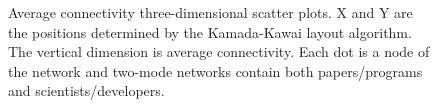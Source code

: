 \begin{figure}[p]
\hspace{.02in}

\caption[Average connectivity three-dimensional scatter plots.]{Average connectivity three-dimensional scatter plots. X and Y are the positions determined by the Kamada-Kawai layout algorithm. The vertical dimension is average connectivity. Each dot is a node of the network and two-mode networks contain both papers/programs and scientists/developers.}
\label{fig:scatter3d}
\end{figure}

